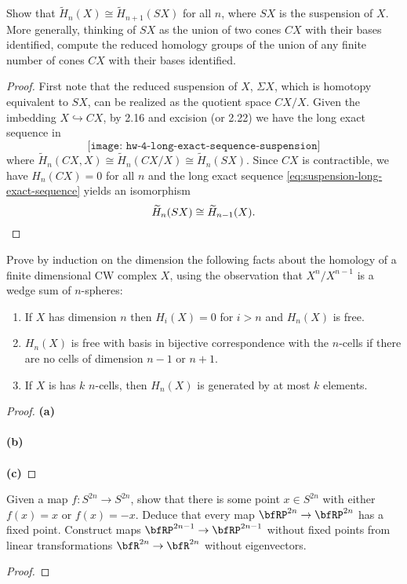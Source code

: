 \begin{problem}[Hatcher {\S}2.1, Ex.\@ 20]
Show that $\widetilde H_n(X)\cong\widetilde H_{n+1}(SX)$ for all $n$, where
$SX$ is the suspension of $X$. More generally, thinking of $SX$ as the
union of two cones $CX$ with their bases identified, compute the reduced
homology groups of the union of any finite number of cones $CX$ with their
bases identified.
\end{problem}
\begin{proof}
First note that the reduced suspension of $X$, $\Sigma X$, which is
homotopy equivalent to $SX$, can be realized as the quotient space
$CX/X$. Given the imbedding $X\hookrightarrow CX$, by 2.16 and excision (or
2.22) we have the long exact sequence in
\begin{equation}
\label{eq:suspension-long-exact-sequence}
\texttt{[image: hw-4-long-exact-sequence-suspension]}
\end{equation}
where $\widetilde H_n(CX,X)\cong\widetilde H_n(CX/X)\cong\widetilde
H_n(SX)$. Since $CX$ is contractible, we have $H_n(CX)=0$ for all
$n$ and the long exact sequence \eqref{eq:suspension-long-exact-sequence}
yields an isomorphism
\[
\widetilde H_n(SX)\cong\widetilde H_{n-1}(X).\qedhere
\]
\end{proof}
\newpage

\begin{problem}[Hatcher {\S}2.1, Ex.\@ 22]
Prove by induction on the dimension the following facts about the homology
of a finite dimensional CW complex $X$, using the observation that
$X^n/X^{n-1}$ is a wedge sum of $n$-spheres:
\begin{enumerate}[label=(\alph*)]
\item If $X$ has dimension $n$ then $H_i(X)=0$ for $i>n$ and $H_n(X)$ is
  free.
\item $H_n(X)$ is free with basis in bijective correspondence with the
  $n$-cells if there are no cells of dimension $n-1$ or $n+1$.
\item If $X$ is has $k$ $n$-cells, then $H_n(X)$ is generated by at most
  $k$ elements.
\end{enumerate}
\end{problem}
\begin{proof}
\textbf{(a)}
\\\\
\textbf{(b)}
\\\\
\textbf{(c)}
\end{proof}
\newpage

\begin{problem}[Hatcher {\S}2.2, Ex.\@ 2]
Given a map $f\colon S^{2n}\to S^{2n}$, show that there is some point $x\in
S^{2n}$ with either $f(x)=x$ or $f(x)=-x$. Deduce that every map
$\bfRP^{2n}\to\bfRP^{2n}$ has a fixed point. Construct maps
$\bfRP^{2n-1}\to\bfRP^{2n-1}$ without fixed points from linear
transformations $\bfR^{2n}\to\bfR^{2n}$ without eigenvectors.
\end{problem}
\begin{proof}
\end{proof}

